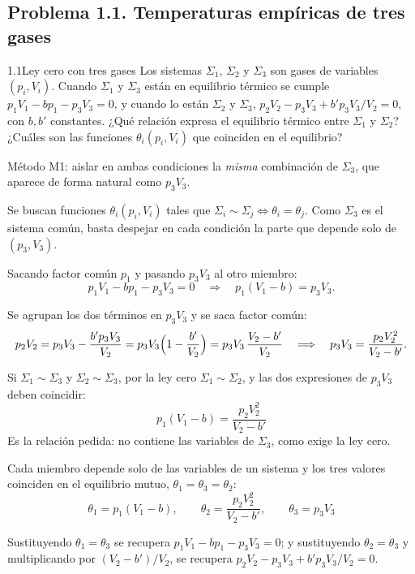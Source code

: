 \subsection{Problema 1.1. Temperaturas empíricas de tres gases}
\begin{problema}{1.1}{Ley cero con tres gases}
Los sistemas $\Sigma_1$, $\Sigma_2$ y $\Sigma_3$ son gases de variables $(p_i,V_i)$. Cuando $\Sigma_1$ y
$\Sigma_3$ están en equilibrio térmico se cumple $p_1V_1-bp_1-p_3V_3=0$, y cuando lo están $\Sigma_2$ y
$\Sigma_3$, $p_2V_2-p_3V_3+b'p_3V_3/V_2=0$, con $b,b'$ constantes. ¿Qué relación expresa el equilibrio
térmico entre $\Sigma_1$ y $\Sigma_2$? ¿Cuáles son las funciones $\theta_i(p_i,V_i)$ que coinciden en el
equilibrio?
\end{problema}

\begin{resolucion}
\idea Método M1: aislar en ambas condiciones la \emph{misma} combinación de $\Sigma_3$, que aparece de
forma natural como $p_3V_3$.

 Se buscan funciones $\theta_i(p_i,V_i)$ tales que
$\Sigma_i\sim\Sigma_j\iff\theta_i=\theta_j$. Como $\Sigma_3$ es el sistema común, basta despejar en cada
condición la parte que depende solo de $(p_3,V_3)$.

 Sacando factor común $p_1$ y
pasando $p_3V_3$ al otro miembro:
\[
  p_1V_1-bp_1-p_3V_3=0\quad\Longrightarrow\quad p_1(V_1-b)=p_3V_3.
\]

 Se agrupan los dos términos en
$p_3V_3$ y se saca factor común:
\[
  p_2V_2=p_3V_3-\frac{b'p_3V_3}{V_2}=p_3V_3\Bigl(1-\frac{b'}{V_2}\Bigr)=p_3V_3\,\frac{V_2-b'}{V_2}
  \quad\Longrightarrow\quad p_3V_3=\frac{p_2V_2^2}{V_2-b'}.
\]

 Si $\Sigma_1\sim\Sigma_3$ y $\Sigma_2\sim\Sigma_3$, por la ley cero
$\Sigma_1\sim\Sigma_2$, y las dos expresiones de $p_3V_3$ deben coincidir:
\[
  \boxed{\,p_1(V_1-b)=\frac{p_2V_2^2}{V_2-b'}\,}
\]
Es la relación pedida: no contiene las variables de $\Sigma_3$, como exige la ley cero.

 Cada miembro depende solo de las variables de un sistema y los
tres valores coinciden en el equilibrio mutuo, $\theta_1=\theta_3=\theta_2$:
\[
  \boxed{\,\theta_1=p_1(V_1-b),\qquad\theta_2=\frac{p_2V_2^2}{V_2-b'},\qquad\theta_3=p_3V_3\,}
\]

 Sustituyendo $\theta_1=\theta_3$ se recupera $p_1V_1-bp_1-p_3V_3=0$; y
sustituyendo $\theta_2=\theta_3$ y multiplicando por $(V_2-b')/V_2$, se recupera
$p_2V_2-p_3V_3+b'p_3V_3/V_2=0$.
\end{resolucion}


